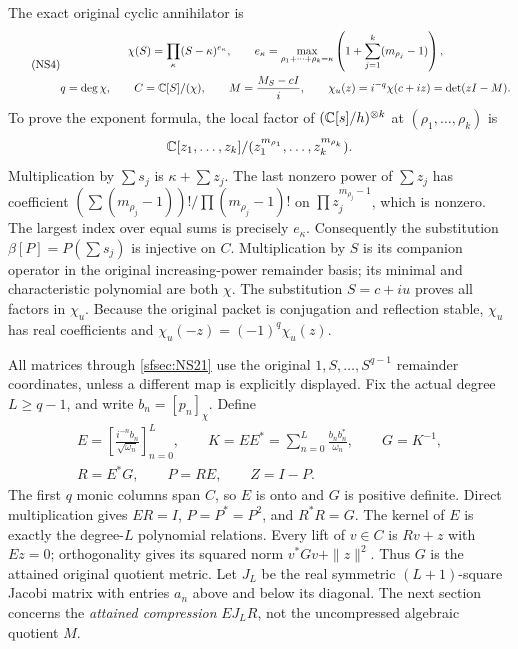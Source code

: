 \documentclass[11pt]{article}
\begin{document}
The exact original cyclic annihilator is
\begin{equation}\tag{NS4}\label{sfsec:NS4}
\begin{gathered}
\chi(S)=\prod_\kappa(S-\kappa)^{e_\kappa},\qquad
e_\kappa=\max_{\rho_1+\cdots+\rho_k=\kappa}
 \left(1+\sum_{j=1}^k(m_{\rho_j}-1)\right),\\
q=\deg\chi,\qquad C=\mathbb C[S]/(\chi),\qquad
M=\frac{M_S-cI}{i},\qquad
\chi_u(z)=i^{-q}\chi(c+iz)=\det(zI-M).
\end{gathered}
\end{equation}
To prove the exponent formula, the local factor of
$(\mathbb C[s]/h)^{\otimes k}$ at $(\rho_1,\ldots,\rho_k)$ is
\[
\mathbb C[z_1,\ldots,z_k]/
       (z_1^{m_{\rho_1}},\ldots,z_k^{m_{\rho_k}}).
\]
Multiplication by $\sum s_j$ is $\kappa+\sum z_j$.
The last nonzero power of $\sum z_j$ has coefficient
$(\sum(m_{\rho_j}-1))!/\prod(m_{\rho_j}-1)!$ on
$\prod z_j^{m_{\rho_j}-1}$, which is nonzero.
The largest index over equal sums is precisely $e_\kappa$.
Consequently the substitution $\beta[P]=P(\sum s_j)$ is
injective on $C$. Multiplication by $S$ is its companion
operator in the original increasing-power remainder basis;
its minimal and characteristic polynomial are both $\chi$.
The substitution $S=c+iu$ proves all factors in $\chi_u$.
Because the original packet is conjugation and reflection
stable, $\chi_u$ has real coefficients and
$\chi_u(-z)=(-1)^q\chi_u(z)$.

All matrices through \eqref{sfsec:NS21} use the original
$1,S,\ldots,S^{q-1}$ remainder coordinates, unless a different
map is explicitly displayed. Fix the actual degree $L\geq q-1$,
and write $b_n=[p_n]_\chi$. Define
\begin{equation}\tag{NS5}\label{sfsec:NS5}
\begin{gathered}
E=\left[\frac{i^{-n}b_n}{\sqrt{\omega_n}}\right]_{n=0}^L,
\qquad K=EE^*=\sum_{n=0}^L\frac{b_nb_n^*}{\omega_n},
\qquad G=K^{-1},\\
R=E^*G,\qquad P=RE,\qquad Z=I-P.
\end{gathered}
\end{equation}
The first $q$ monic columns span $C$, so $E$ is onto and $G$
is positive definite. Direct multiplication gives $ER=I$,
$P=P^*=P^2$, and $R^*R=G$.
The kernel of $E$ is exactly the degree-$L$ polynomial
relations. Every lift of $v\in C$ is $Rv+z$ with $Ez=0$;
orthogonality gives its squared norm $v^*Gv+\|z\|^2$.
Thus $G$ is the attained original quotient metric.
Let $J_L$ be the real symmetric $(L+1)$-square Jacobi matrix
with entries $a_n$ above and below its diagonal. The next
section concerns the \emph{attained compression}
$EJ_LR$, not the uncompressed algebraic quotient $M$.
\end{document}
